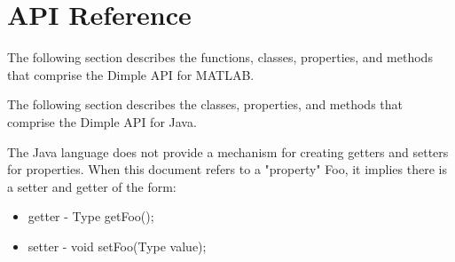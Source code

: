\section{API Reference}

\ifmatlab
The following section describes the functions, classes, properties, and methods that comprise the Dimple API for MATLAB. 
\fi


\ifjava
The following section describes the classes, properties, and methods that comprise the Dimple API for Java. 

The Java language does not provide a mechanism for creating getters and setters for properties.  When this document refers to a "property" Foo, it implies there is a setter and getter of the form:

\begin{itemize}
\item getter - Type getFoo();
\item setter - void setFoo(Type value);
\end{itemize}
\fi









\ifmatlab

\fi


